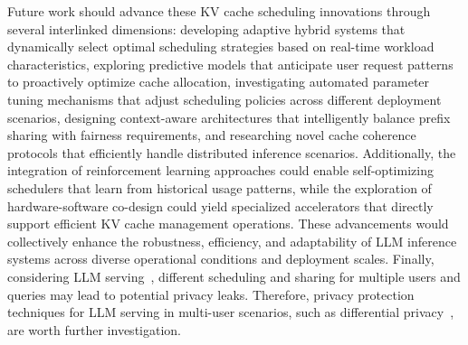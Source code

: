 Future work should advance these KV cache scheduling innovations through several interlinked dimensions: developing adaptive hybrid systems that dynamically select optimal scheduling strategies based on real-time workload characteristics, exploring predictive models that anticipate user request patterns to proactively optimize cache allocation, investigating automated parameter tuning mechanisms that adjust scheduling policies across different deployment scenarios, designing context-aware architectures that intelligently balance prefix sharing with fairness requirements, and researching novel cache coherence protocols that efficiently handle distributed inference scenarios. Additionally, the integration of reinforcement learning approaches could enable self-optimizing schedulers that learn from historical usage patterns, while the exploration of hardware-software co-design could yield specialized accelerators that directly support efficient KV cache management operations. These advancements would collectively enhance the robustness, efficiency, and adaptability of LLM inference systems across diverse operational conditions and deployment scales.
Finally, considering LLM serving~\cite{yao2024cacheblend}, different scheduling and sharing for multiple users and queries may lead to potential privacy leaks. Therefore, privacy protection techniques for LLM serving in multi-user scenarios, such as differential privacy~\cite{zhao2022survey,dong2021residual,dong2023continual
}, are worth further investigation.

